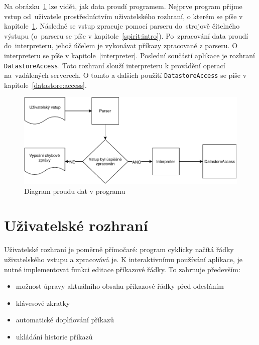 \documentclass[thesis=B,czech,hidelinks]{FITthesis}[2019/03/06]
\begin{document}
Na obrázku~\ref{proud:dat} lze vidět, jak data proudí programem. Nejprve program přijme vstup od~uživatele prostředníctvím uživatelského rozhraní, o kterém se píše v kapitole~\ref{ui}. Následně se vstup zpracuje pomocí parseru do~strojově čitelného výstupu (o~parseru se píše v kapitole~\ref{spirit:intro}). Po~zpracování data proudí do~interpreteru, jehož účelem je vykonávat příkazy zpracované z parseru. O interpreteru se píše v kapitole~\ref{interpreter}. Poslední součástí aplikace je rozhraní \texttt{DatastoreAccess}. Toto rozhraní slouží interpreteru k provádění operací na~vzdálených serverech. O tomto a dalších použití \texttt{DatastoreAccess} se píše v kapitole~\ref{datastore:access}.
\begin{figure}
\begin{center}
\includegraphics[width=.9\textwidth]{diagram}
\end{center}
\caption{Diagram proudu dat v programu}\label{proud:dat}
\end{figure}


\section{Uživatelské rozhraní}\label{ui}
Uživatelské rozhraní je poměrně přímočaré: program cyklicky načítá řádky uživatelského vstupu a zpracovává je. K interaktivnímu používání aplikace, je nutné implementovat funkci editace příkazové řádky. To zahrnuje především:
\begin{itemize}
    \item možnost úpravy aktuálního obsahu příkazové řádky před odesláním
    \item klávesové zkratky
    \item automatické doplňování příkazů
    \item ukládání historie příkazů
\end{itemize}
\end{document}
